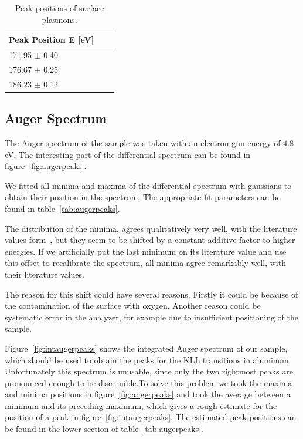 \documentclass[a4paper,10pt]{scrartcl}
\begin{document}
\begin{table}
\begin{center}
\begin{tabular}{lcc}
\toprule
Peak Position E [eV]\\
\midrule
171.95 $\pm$ 0.40 \\
176.67 $\pm$ 0.25 \\
186.23 $\pm$ 0.12 \\
\bottomrule
\end{tabular}
\end{center}
\par
\caption{Peak positions of surface plasmons. \label{tab:surfacepeaks}}
\end{table}

\subsection{Auger Spectrum}

The Auger spectrum of the sample was taken with an electron gun energy of $4.8\,$eV. The interesting part of the differential spectrum can be found in figure~\ref{fig:augerpeaks}. 

We fitted all minima and maxima of the differential spectrum with gaussians to obtain their position in the spectrum. The appropriate fit parameters can be found in table~\ref{tab:augerpeaks}.

The distribution of the minima, agrees qualitatively very well, with the literature values form~\cite{handbook}, but they seem to be shifted by a constant additive factor to higher energies. If we artificially put the last minimum on its literature value and use this offset to recalibrate the spectrum, all minima agree remarkably well, with their literature values.

The reason for this shift could have several reasons. Firstly it could be because of the contamination of the surface with oxygen. Another reason could be systematic error in the analyzer, for example due to insufficient positioning of the sample.

Figure~\ref{fig:intaugerpeaks} shows the integrated Auger spectrum of our sample, which should be used to obtain the peaks for the KLL transitions in aluminum. Unfortunately this spectrum is unusable, since only the two rightmost peaks are pronounced enough to be discernible.To solve this problem we took the maxima and minima positions in figure~\ref{fig:augerpeaks} and took the average between a minimum and its preceding maximum, which gives a rough estimate for the position of a peak in figure~\ref{fig:intaugerpeaks}. The estimated peak positions can be found in the lower section of table~\ref{tab:augerpeaks}. 
\end{document}

